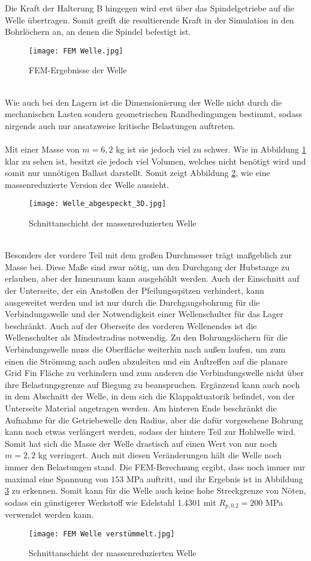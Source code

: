 Die Kraft der Halterung B hingegen wird erst über das Spindelgetriebe auf die Welle übertragen. Somit greift die resultierende Kraft in der Simulation in den Bohrlöchern an, an denen die Spindel befestigt ist.
\begin{figure}[h] 
	\centering
	\texttt{[image: FEM Welle.jpg]}
	\caption{FEM-Ergebnisse der Welle}
	\label{abb_Well_FEM}
\end{figure}\\
Wie auch bei den Lagern ist die Dimensionierung der Welle nicht durch die mechanischen Lasten sondern geometrischen Randbedingungen bestimmt, sodass nirgends auch nur ansatzweise kritische Belastungen auftreten.
\\~\\
Mit einer Masse von $m=6,2$ kg ist sie jedoch viel zu schwer. Wie in Abbildung \ref{abb_Well_FEM} klar zu sehen ist, besitzt sie jedoch viel Volumen, welches nicht benötigt wird und somit nur unnötigen Ballast darstellt. Somit zeigt Abbildung \ref{abb_abgespeckt}, wie eine massenreduzierte Version der Welle aussieht.
\begin{figure}[h] 
	\centering
	\texttt{[image: Welle\_abgespeckt\_3D.jpg]}
	\caption{Schnittanschicht der massenreduzierten Welle}
	\label{abb_abgespeckt}
\end{figure}\\ Besonders der vordere Teil mit dem großen Durchmesser trägt maßgeblich zur Masse bei. Diese Maße sind zwar nötig, um den Durchgang der Hubstange zu erlauben, aber der Innenraum kann ausgehöhlt werden. Auch der Einschnitt auf der Unterseite, der ein Anstoßen der Pfeilungsspitzen verhindert, kann ausgeweitet werden und ist nur durch die Durchgangsbohrung für die Verbindungswelle und der Notwendigkeit einer Wellenschulter für das Lager beschränkt. Auch auf der Oberseite des vorderen Wellenendes ist die Wellenschulter als Mindestradius notwendig. Zu den Bohrungslöchern für die Verbindungswelle muss die Oberfläche weiterhin nach außen laufen, um zum einen die Strömung nach außen abzuleiten und ein Auftreffen auf die planare Grid Fin Fläche zu verhindern und zum anderen die Verbindungswelle nicht über ihre Belastungsgrenze auf Biegung zu beanspruchen. Ergänzend kann auch noch in dem Abschnitt der Welle, in dem sich die Klappaktuatorik befindet, von der Unterseite Material angetragen werden. Am hinteren Ende beschränkt die Aufnahme für die Getriebewelle den Radius, aber die dafür vorgesehene Bohrung kann noch etwas verlängert werden, sodass der hintere Teil zur Hohlwelle wird. Somit hat sich die Masse der Welle drastisch auf einen Wert von nur noch $m= 2,2$ kg verringert. Auch mit diesen Veränderungen hält die Welle noch immer den Belastungen stand. Die FEM-Berechnung ergibt, dass noch immer nur maximal eine Spannung von $153$ MPa auftritt, und ihr Ergebnis ist in Abbildung \ref{abb_abgespecktFEM} zu erkennen. Somit kann für die Welle auch keine hohe Streckgrenze von Nöten, sodass ein günstigerer Werkstoff wie Edelstahl 1.4301 mit $R_{p, 0.2} = 200$ MPa verwendet werden kann.
\begin{figure}[h] 
\centering
\texttt{[image: FEM Welle verstümmelt.jpg]}
\caption{Schnittanschicht der massenreduzierten Welle}
\label{abb_abgespecktFEM}
\end{figure}
